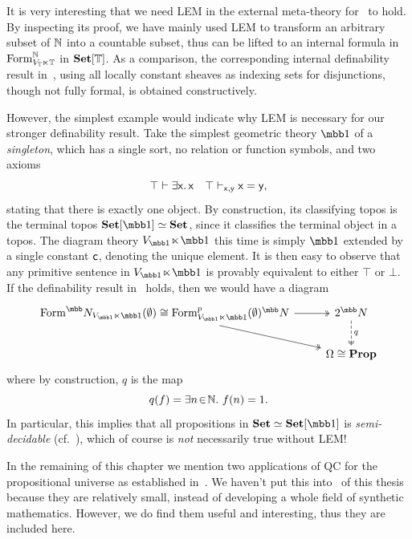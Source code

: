 \begin{remark}\label{rem:roleofexcludedmiddle}
  It is very interesting that we need \gls{LEM} in the external meta-theory for~ to hold. By inspecting its proof, we have mainly used \gls{LEM} to transform an arbitrary subset of $\mathbb{N}$ into a countable subset, thus can be lifted to an internal formula in $\mathrm{Form}^{\mathbb{N}}_{V_{\mathbb{T}}\ltimes\mathbb{T}}$ in $\mathbf{Set}[\mathbb{T}]$. As a comparison, the corresponding internal definability result in~\citet{blechschmidt_general_2020}, using all locally constant sheaves as indexing sets for disjunctions, though not fully formal, is obtained constructively.

  However, the simplest example would indicate why \gls{LEM} is necessary for our stronger definability result. Take the simplest geometric theory $\mbb 1$ of a \emph{singleton}, which has a single sort, no relation or function symbols, and two axioms 
  \[ \top \vdash \exists \mathsf{x}.\,\mathsf{x} \quad \top \vdash_{\mathsf{x},\mathsf{y}} \mathsf{x} = \mathsf{y}, \]
  stating that there is exactly one object. By construction, its classifying topos is the terminal topos $\Set[\mbb 1] \simeq \Set$, since it classifies the terminal object in a topos. The diagram theory $V_{\mbb 1} \!\ltimes\! \mbb 1$ this time is simply $\mbb 1$ extended by a single constant $\mathsf{c}$, denoting the unique element. It is then easy to observe that any primitive sentence in $V_{\mbb 1} \!\ltimes\! \mbb 1$ is provably equivalent to either $\top$ or $\bot$. If the definability result in~ holds, then we would have a diagram 
  \[
  \begin{tikzcd}
    \form^\N_{V_{\mbb 1} \ltimes \mbb 1}(\emp) \cong \form^p_{V_{\mbb 1}\ltimes\mbb 1}(\emp)^\N \ar[r, two heads] \ar[dr, two heads] & 2^\N \ar[d, dashed, two heads, "q"] \\
    & \Omega \cong \pp
  \end{tikzcd}
  \]
  where by construction, $q$ is the map 
  \[ q(f) = \exists n\!\in\!\mathbb{N}.\  f(n) = 1. \]
  In particular, this implies that all propositions in $\Set \simeq \Set[\mbb 1]$ is \emph{semi-decidable} (cf.~), which of course is \emph{not} necessarily true without \gls{LEM}!
\end{remark}

In the remaining of this chapter we mention two applications of \gls{QC} for the propositional universe as established in~. We haven't put this into~ of this thesis because they are relatively small, instead of developing a whole field of synthetic mathematics. However, we do find them useful and interesting, thus they are included here.

